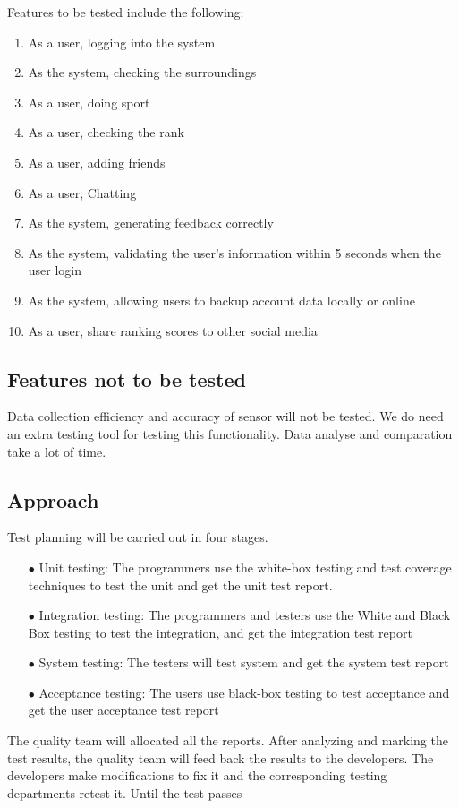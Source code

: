 \documentclass[a4paper]{article}
\begin{document}
	Features to be tested include the following:
	\begin{enumerate}[itemindent=2em]
		\item As a user, logging into the system
		\item As the system, checking the surroundings
		\item As a user, doing sport
		\item As a user, checking the rank
		\item As a user, adding friends
		\item As a user, Chatting
		\item As the system, generating feedback correctly
		\item As the system, validating the user's information within 5 seconds when the user login
		\item As the system, allowing users to backup account data locally or online
		\item As a user, share ranking scores to other social media
	\end{enumerate}

	\subsection{Features not to be tested}

	Data collection efficiency and accuracy of sensor will not be tested. We do need an extra testing tool for testing this functionality. Data analyse and comparation take a lot of time.

	\subsection{Approach}

	Test planning will be carried out in four stages.
	\begin{itemize}[itemindent=2em]
		\item[$\bullet$] Unit testing: The programmers use the white-box testing and test coverage techniques to test the unit and get the unit test report.
		\item[$\bullet$] Integration testing: The programmers and testers use the White and Black Box testing to test the integration, and get the integration test report
		\item[$\bullet$] System testing: The testers will test system and get the system test report
		\item[$\bullet$] Acceptance testing: The users use black-box testing to test acceptance and get the user acceptance test report
	\end{itemize}\par
	The quality team will allocated all the reports. After analyzing and marking the test results, the quality team will feed back the results to the developers. The developers make modifications to fix it and the corresponding testing departments retest it. Until the test passes
\end{document}

